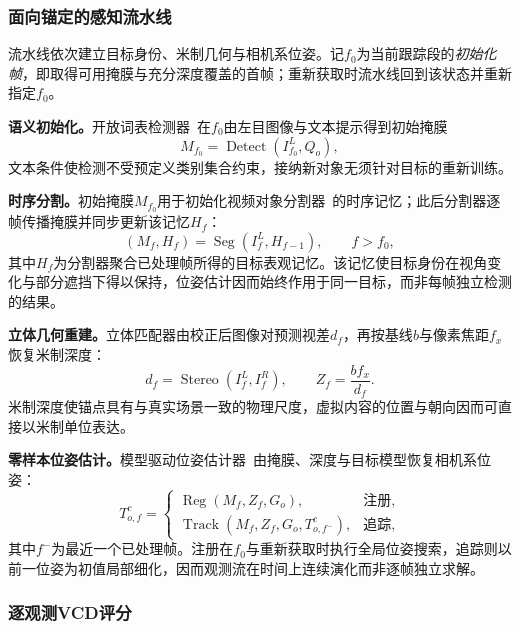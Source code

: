 \documentclass[review]{vgtc}
\begin{document}
\subsubsection{面向锚定的感知流水线}

流水线依次建立目标身份、米制几何与相机系位姿。记$f_0$为当前跟踪段的\emph{初始化帧}，即取得可用掩膜与充分深度覆盖的首帧；重新获取时流水线回到该状态并重新指定$f_0$。

\textbf{语义初始化。}开放词表检测器~\cite{yoloe2025}在$f_0$由左目图像与文本提示得到初始掩膜
\begin{equation}
M_{f_0} = \operatorname{Detect}(I_{f_0}^{L}, Q_o),
\label{eq:detect}
\end{equation}
文本条件使检测不受预定义类别集合约束，接纳新对象无须针对目标的重新训练。

\textbf{时序分割。}初始掩膜$M_{f_0}$用于初始化视频对象分割器~\cite{cutie2024}的时序记忆；此后分割器逐帧传播掩膜并同步更新该记忆$H_f$：
\begin{equation}
(M_f, H_f) = \operatorname{Seg}(I_f^{L}, H_{f-1}), \qquad f > f_0,
\label{eq:seg}
\end{equation}
其中$H_f$为分割器聚合已处理帧所得的目标表观记忆。该记忆使目标身份在视角变化与部分遮挡下得以保持，位姿估计因而始终作用于同一目标，而非每帧独立检测的结果。

\textbf{立体几何重建。}立体匹配器由校正后图像对预测视差$d_f$，再按基线$b$与像素焦距$f_x$恢复米制深度：
\begin{equation}
d_f = \operatorname{Stereo}(I_f^{L}, I_f^{R}), \qquad Z_f = \frac{b f_x}{d_f}.
\label{eq:depth}
\end{equation}
米制深度使锚点具有与真实场景一致的物理尺度，虚拟内容的位置与朝向因而可直接以米制单位表达。

\textbf{零样本位姿估计。}模型驱动位姿估计器~\cite{foundationpose2023}由掩膜、深度与目标模型恢复相机系位姿：
\begin{equation}
T_{o,f}^{c} =
\begin{cases}
\operatorname{Reg}(M_f, Z_f, G_o), & \text{注册}, \\
\operatorname{Track}(M_f, Z_f, G_o, T_{o,f^-}^{c}), & \text{追踪},
\end{cases}
\label{eq:pose}
\end{equation}
其中$f^-$为最近一个已处理帧。注册在$f_0$与重新获取时执行全局位姿搜索，追踪则以前一位姿为初值局部细化，因而观测流在时间上连续演化而非逐帧独立求解。

\subsubsection{逐观测VCD评分}
\end{document}
